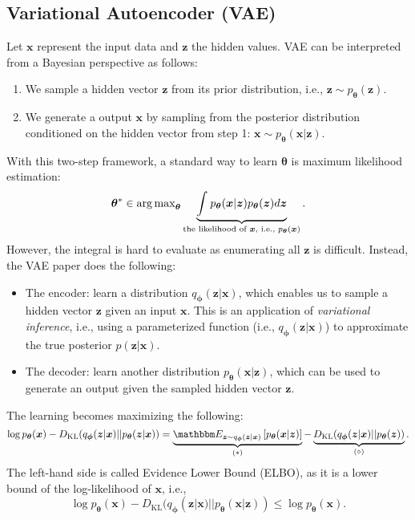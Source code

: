 \subsection{Variational Autoencoder (VAE)}
Let $\bm{x}$ represent the input data and $\bm{z}$ the hidden values. 
VAE can be interpreted from a Bayesian perspective as follows:
    \begin{enumerate}
        \item We sample a hidden vector $\bm{z}$ from its prior distribution, i.e., $\bm{z} \sim p_{\bm{\theta}}(\bm{z})$.
        \item We generate a output $\bm{x}$ by sampling from the posterior distribution conditioned on the hidden vector from step 1:  $\bm{x} \sim p_{\bm{\theta}}(\bm{x} | \bm{z})$.
    \end{enumerate}
With this two-step framework, a standard way to learn $\bm{\theta}$ is maximum likelihood estimation:
    \begin{equation}
        \bm{\theta}^\ast \in \operatorname{arg\,max}_{\bm{\theta}} \underbrace{ \int_{}^{}{p_{  \bm{\theta}}(\bm{x} | \bm{z}) p_{\bm{\theta}}(\bm{z})} d \bm{z} }_{\text{the likelihood of $\bm{x}$, i.e., $p_{\bm{\theta}}(\bm{x})$}}.
    \end{equation}
However, the integral is hard to evaluate as enumerating all $\bm{z}$ is difficult.
Instead, the VAE paper does the following:
    \begin{itemize}
        \item The encoder: learn a distribution $q_{\bm{\phi}}(\bm{z} | \bm{x})$, which enables us to sample a hidden vector $\bm{z}$ given an input $\bm{x}$.
        This is an application of \emph{variational inference}, i.e., using a parameterized function (i.e., $q_{\bm{\phi}}(\bm{z} | \bm{x})$) to approximate the true posterior $p(\bm{z} | \bm{x})$.
        \item The decoder: learn another distribution $p_{\bm{\theta}}(\bm{x} | \bm{z})$, which can be used to generate an output given the sampled hidden vector $\bm{z}$.
    \end{itemize}
The learning becomes maximizing the following:
    \begin{equation}\label{vae:obj}
        \log p_{\bm{\theta}}(\bm{x}) - D_\text{KL}(q_{\bm{\phi}}(\bm{z} | \bm{x}) || p_{\bm{\theta}}(\bm{z} | \bm{x})) = 
        \underbrace{\E_{\bm{z} \sim q_{\bm{\phi}}(\bm{z} | \bm{x})}\left[ p_{\bm{\theta}}(\bm{x} | \bm{z}) \right]}_{(\ast)} - \underbrace{D_\text{KL}(q_{\bm{\phi}}(\bm{z} | \bm{x}) || p_{\bm{\theta}}(\bm{z}))}_{(\diamond)}.
    \end{equation}
The left-hand side is called Evidence Lower Bound (ELBO), as it is a lower bound of the log-likelihood of $\bm{x}$, i.e.,
    \begin{equation}
        \log p_{\bm{\theta}}(\bm{x}) - D_\text{KL}(q_{\bm{\phi}}(\bm{z} | \bm{x})  ||  p_{\bm{\theta}}(\bm{x} | \bm{z})) \le \log p_{\bm{\theta}}(\bm{x}).
    \end{equation}

